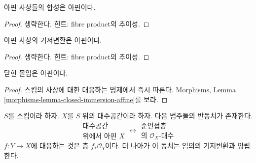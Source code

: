 \begin{lemma}
\label{lemma-composition-affine}
아핀 사상들의 합성은 아핀이다.
\end{lemma}

\begin{proof}
생략한다. 힌트: fibre product의 추이성.
\end{proof}

\begin{lemma}
\label{lemma-base-change-affine}
아핀 사상의 기저변환은 아핀이다.
\end{lemma}

\begin{proof}
생략한다. 힌트: fibre product의 추이성.
\end{proof}

\begin{lemma}
\label{lemma-closed-immersion-affine}
닫힌 몰입은 아핀이다.
\end{lemma}

\begin{proof}
스킴의 사상에 대한 대응하는 명제에서 즉시 따른다. Morphisms,
Lemma \ref{morphisms-lemma-closed-immersion-affine}를 보라.
\end{proof}

\begin{lemma}
\label{lemma-affine-equivalence-algebras}
$S$를 스킴이라 하자. $X$를 $S$ 위의 대수공간이라 하자.
다음 범주들의 반동치가 존재한다.
$$
\begin{matrix}
\text{대수공간}\\
\text{위에서 아핀 }X
\end{matrix}
\longleftrightarrow
\begin{matrix}
\text{준연접층}\\
\text{의 }\mathcal{O}_X\text{-대수}
\end{matrix}
$$
$f : Y \to X$에 대응하는 것은 층 $f_*\mathcal{O}_Y$이다.
더 나아가 이 동치는 임의의 기저변환과 양립한다.
\end{lemma}


